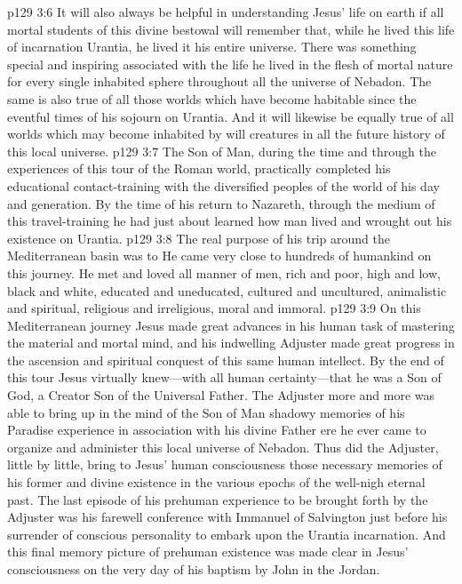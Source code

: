\pc \vs p129 3:6 It will also always be helpful in understanding Jesus’ life on earth if all mortal students of this divine bestowal will remember that, while he lived this life of incarnation  Urantia, he lived it  his entire universe. There was something special and inspiring associated with the life he lived in the flesh of mortal nature for every single inhabited sphere throughout all the universe of Nebadon. The same is also true of all those worlds which have become habitable since the eventful times of his sojourn on Urantia. And it will likewise be equally true of all worlds which may become inhabited by will creatures in all the future history of this local universe.
\pc \vs p129 3:7 The Son of Man, during the time and through the experiences of this tour of the Roman world, practically completed his educational contact\hyp{}training with the diversified peoples of the world of his day and generation. By the time of his return to Nazareth, through the medium of this travel\hyp{}training he had just about learned how man lived and wrought out his existence on Urantia.
\vs p129 3:8 The real purpose of his trip around the Mediterranean basin was to  He came very close to hundreds of humankind on this journey. He met and loved all manner of men, rich and poor, high and low, black and white, educated and uneducated, cultured and uncultured, animalistic and spiritual, religious and irreligious, moral and immoral.
\vs p129 3:9 On this Mediterranean journey Jesus made great advances in his human task of mastering the material and mortal mind, and his indwelling Adjuster made great progress in the ascension and spiritual conquest of this same human intellect. By the end of this tour Jesus virtually knew---with all human certainty---that he was a Son of God, a Creator Son of the Universal Father. The Adjuster more and more was able to bring up in the mind of the Son of Man shadowy memories of his Paradise experience in association with his divine Father ere he ever came to organize and administer this local universe of Nebadon. Thus did the Adjuster, little by little, bring to Jesus’ human consciousness those necessary memories of his former and divine existence in the various epochs of the well\hyp{}nigh eternal past. The last episode of his prehuman experience to be brought forth by the Adjuster was his farewell conference with Immanuel of Salvington just before his surrender of conscious personality to embark upon the Urantia incarnation. And this final memory picture of prehuman existence was made clear in Jesus’ consciousness on the very day of his baptism by John in the Jordan.\plusone
